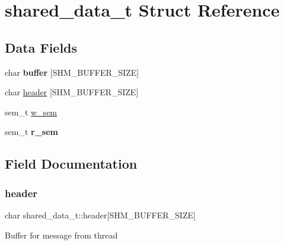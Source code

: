 \hypertarget{structshared__data__t}{}\section{shared\+\_\+data\+\_\+t Struct Reference}
\label{structshared__data__t}
\subsection*{Data Fields}
\begin{DoxyCompactItemize}
\item 
\mbox{\label{structshared__data__t_a0785f67f48f4515c201b188929557e02}} 
char {\bfseries buffer} \mbox{[}S\+H\+M\+\_\+\+B\+U\+F\+F\+E\+R\+\_\+\+S\+I\+ZE\mbox{]}
\item 
char \hyperlink{structshared__data__t_aac4f21bda7f4fc47557faac246f0b3ea}{header} \mbox{[}S\+H\+M\+\_\+\+B\+U\+F\+F\+E\+R\+\_\+\+S\+I\+ZE\mbox{]}
\item 
sem\+\_\+t \hyperlink{structshared__data__t_aaa7bbb7121ee6cebe671dd6e2efb7763}{w\+\_\+sem}
\item 
\mbox{\label{structshared__data__t_a1886c737155efff3666b5b5e22bb7b2a}} 
sem\+\_\+t {\bfseries r\+\_\+sem}
\end{DoxyCompactItemize}


\subsection{Field Documentation}
\mbox{\label{structshared__data__t_aac4f21bda7f4fc47557faac246f0b3ea}} 
\subsubsection{\texorpdfstring{header}{header}}
{\footnotesize\ttfamily char shared\+\_\+data\+\_\+t\+::header\mbox{[}S\+H\+M\+\_\+\+B\+U\+F\+F\+E\+R\+\_\+\+S\+I\+ZE\mbox{]}}

Buffer for message from thread \mbox{\label{structshared__data__t_aaa7bbb7121ee6cebe671dd6e2efb7763}} 
